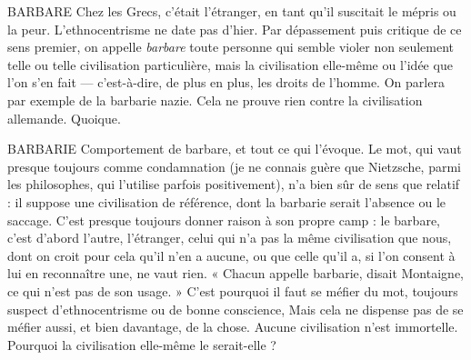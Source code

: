 BARBARE Chez les Grecs, c'était l'étranger, en tant qu’il suscitait le mépris
ou la peur. L’ethnocentrisme ne date pas d’hier. Par dépassement
puis critique de ce sens premier, on appelle {\it barbare} toute personne qui semble
violer non seulement telle ou telle civilisation particulière, mais la civilisation
elle-même ou l’idée que l’on s’en fait — c’est-à-dire, de plus en plus, les droits
de l’homme. On parlera par exemple de la barbarie nazie. Cela ne prouve rien
contre la civilisation allemande. Quoique.

BARBARIE Comportement de barbare, et tout ce qui l’évoque. Le mot, qui
vaut presque toujours comme condamnation (je ne connais
guère que Nietzsche, parmi les philosophes, qui l'utilise parfois positivement),
n’a bien sûr de sens que relatif : il suppose une civilisation de référence, dont la
barbarie serait l’absence ou le saccage. C’est presque toujours donner raison à
son propre camp : le barbare, c’est d’abord l’autre, l'étranger, celui qui n’a pas
la même civilisation que nous, dont on croit pour cela qu’il n’en a aucune, ou
que celle qu’il a, si l’on consent à lui en reconnaître une, ne vaut rien. « Chacun
appelle barbarie, disait Montaigne, ce qui n’est pas de son usage. » C’est pourquoi
il faut se méfier du mot, toujours suspect d’ethnocentrisme ou de bonne
conscience, Mais cela ne dispense pas de se méfier aussi, et bien davantage, de
la chose. Aucune civilisation n’est immortelle. Pourquoi la civilisation elle-même
le serait-elle ?

